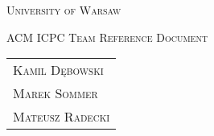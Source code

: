 
\usepackage[utf8]{inputenc}
\usepackage{polski}
\usepackage{amsfonts}


\begin{center}
\textsc{\LARGE University of Warsaw}
\end{center}

\begin{center}
\textsc{ACM ICPC Team Reference Document}
\end{center}

\vspace{0.7cm}

\hfill
\begin{tabular}{l}
  \textsc{Kamil Dębowski} \\
  \textsc{Marek Sommer} \\
  \textsc{Mateusz Radecki} \\
\end{tabular}

